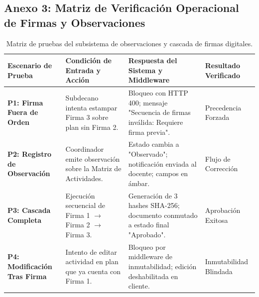 \documentclass[12pt,a4paper]{article}
\begin{document}
\subsection*{Anexo 3: Matriz de Verificación Operacional de Firmas y Observaciones}
\begin{table}[H]
\centering
\small
\renewcommand{\arraystretch}{1.15}
\begin{tabularx}{\textwidth}{|>{\hsize=0.75\hsize\raggedright\arraybackslash\bfseries\footnotesize}X|>{\hsize=1.25\hsize\raggedright\arraybackslash\footnotesize}X|>{\hsize=1.35\hsize\raggedright\arraybackslash\footnotesize}X|>{\hsize=0.65\hsize\centering\arraybackslash\footnotesize}X|}
\hline
\rowcolor{tableheader}
\textbf{Escenario de Prueba} & \textbf{Condición de Entrada y Acción} & \textbf{Respuesta del Sistema y Middleware} & \textbf{Resultado Verificado} \\
\hline
P1: Firma Fuera de Orden & Subdecano intenta estampar Firma 3 sobre plan sin Firma 2. & Bloqueo con HTTP 400; mensaje "Secuencia de firmas inválida: Requiere firma previa". & Precedencia Forzada \\
\hline
P2: Registro de Observación & Coordinador emite observación sobre la Matriz de Actividades. & Estado cambia a "Observado"; notificación enviada al docente; campos en ámbar. & Flujo de Corrección \\
\hline
P3: Cascada Completa & Ejecución secuencial de Firma 1 $\to$ Firma 2 $\to$ Firma 3. & Generación de 3 hashes SHA-256; documento conmutado a estado final "Aprobado". & Aprobación Exitosa \\
\hline
P4: Modificación Tras Firma & Intento de editar actividad en plan que ya cuenta con Firma 1. & Bloqueo por middleware de inmutabilidad; edición deshabilitada en cliente. & Inmutabilidad Blindada \\
\hline
\end{tabularx}
\caption{Matriz de pruebas del subsistema de observaciones y cascada de firmas digitales.}
\end{table}
\end{document}
